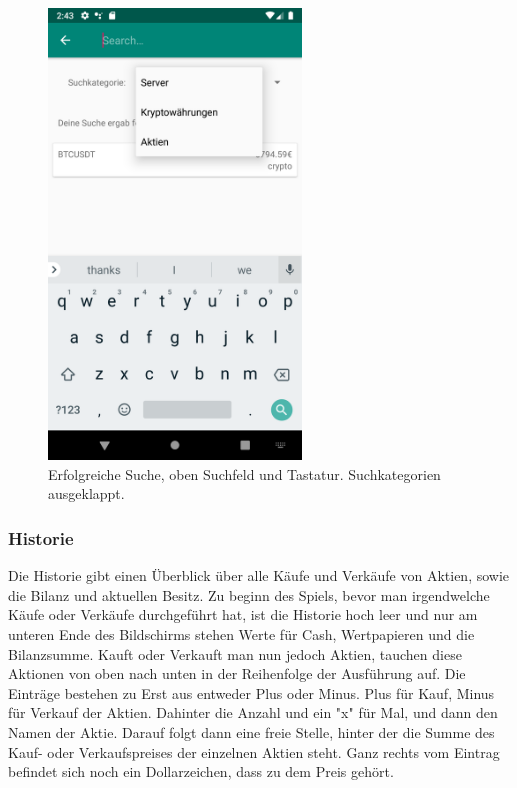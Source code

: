 \documentclass[10pt]{scrartcl}
\begin{document}
\begin{figure}[H]
	\centering
	\includegraphics[width=0.6\textwidth]{Bilder/Applikation/Suche.png}
	\caption{Erfolgreiche Suche, oben Suchfeld und Tastatur. Suchkategorien ausgeklappt.}
\end{figure}

\subsubsection{Historie}

Die Historie gibt einen Überblick über alle Käufe und Verkäufe von Aktien, sowie die Bilanz und aktuellen Besitz. Zu beginn des Spiels, bevor man irgendwelche Käufe oder Verkäufe durchgeführt hat, ist die Historie hoch leer und nur am unteren Ende des Bildschirms stehen Werte für Cash, Wertpapieren und die Bilanzsumme. Kauft oder Verkauft man nun jedoch Aktien, tauchen diese Aktionen von oben nach unten in der Reihenfolge der Ausführung auf. Die Einträge bestehen zu Erst aus entweder Plus oder Minus. Plus für Kauf, Minus für Verkauf der Aktien. Dahinter die Anzahl und ein "x" für Mal, und dann den Namen der Aktie. Darauf folgt dann eine freie Stelle, hinter der die Summe des Kauf- oder Verkaufspreises der einzelnen Aktien steht. Ganz rechts vom Eintrag befindet sich noch ein Dollarzeichen, dass zu dem Preis gehört.
\end{document}
